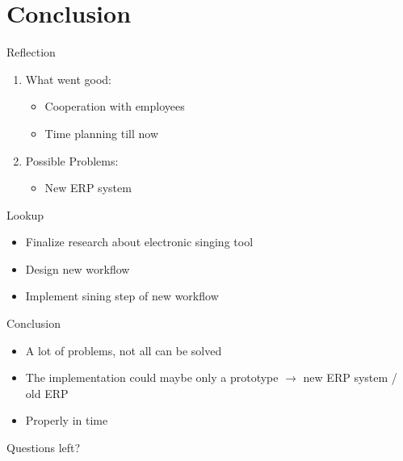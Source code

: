 \documentclass[utf8, xcolor, usenames,dvipsnames, aspectratio=169]{beamer}
\begin{document}
\section{Conclusion}
\begin{frame}{Reflection}
	\begin{enumerate}
		\item What went good:
		\begin{itemize}
			\item Cooperation with employees
			\item Time planning till now
		\end{itemize} 
		\item Possible Problems:
		\begin{itemize}
			\item New ERP system
		\end{itemize}
	\end{enumerate}
\end{frame}

\begin{frame}{Lookup}
	\begin{itemize}
		\item Finalize research about electronic singing tool
		\item Design new workflow
		\item Implement sining step of new workflow
	\end{itemize}
\end{frame}

\begin{frame}{Conclusion}
	\begin{itemize}
		\item A lot of problems, not all can be solved
		\item The implementation could maybe only a prototype $\rightarrow$ new ERP system / old ERP
		\item Properly in time
	\end{itemize}
\end{frame}

\begin{frame}
	\begin{center}
		{\Huge Questions left?}
	\end{center}
\end{frame}
\end{document}
